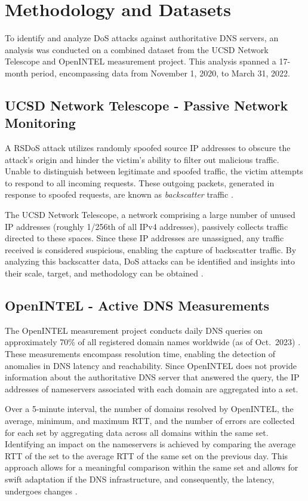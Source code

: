 \section{Methodology and Datasets} \label{sec:methodologyanddatasets}
To identify and analyze \ac{DoS} attacks against authoritative DNS servers, an analysis was conducted on a combined dataset from the UCSD Network Telescope and OpenINTEL measurement project.
This analysis spanned a 17-month period, encompassing data from November 1, 2020, to March 31, 2022.


\subsection{UCSD Network Telescope - Passive Network Monitoring} \label{subsec:ucsd}
A \ac{RSDoS} attack utilizes randomly spoofed source IP addresses to obscure the attack's origin and hinder the victim's ability to filter out malicious traffic.
Unable to distinguish between legitimate and spoofed traffic, the victim attempts to respond to all incoming requests.
These outgoing packets, generated in response to spoofed requests, are known as \textit{backscatter} traffic \cite{caidarsdos}.

The UCSD Network Telescope, a network comprising a large number of unused IP addresses (roughly 1/256th of all IPv4 addresses), passively collects traffic directed to these spaces.
Since these IP addresses are unassigned, any traffic received is considered suspicious, enabling the capture of backscatter traffic.
By analyzing this backscatter data, DoS attacks can be identified and insights into their scale, target, and methodology can be obtained \cite{caidatelescope} \cite{10.1145/1132026.1132027}.


\subsection{OpenINTEL - Active DNS Measurements} \label{subsec:openintel}
The OpenINTEL measurement project conducts daily DNS queries on approximately 70\% of all registered domain names worldwide (as of Oct.\ 2023) \cite{openintel} \cite{dnib2023q2}.
These measurements encompass resolution time, enabling the detection of anomalies in DNS latency and reachability.
Since OpenINTEL does not provide information about the authoritative DNS server that answered the query, the IP addresses of nameservers associated with each domain are aggregated into a set.

Over a 5-minute interval, the number of domains resolved by OpenINTEL, the average, minimum, and maximum \acf{RTT}, and the number of errors are collected for each set by aggregating data across all domains within the same set.
Identifying an impact on the nameservers is achieved by comparing the average RTT of the set to the average RTT of the same set on the previous day.
This approach allows for a meaningful comparison within the same set and allows for swift adaptation if the DNS infrastructure, and consequently, the latency, undergoes changes \cite{Sommese2022DDoSDNS}.


